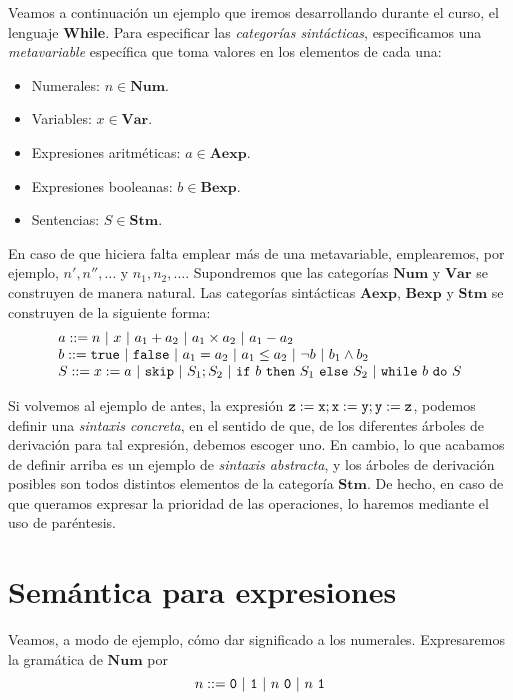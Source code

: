 Veamos a continuación un ejemplo que iremos desarrollando durante el curso, el lenguaje \textbf{While}. Para especificar las \textit{categorías sintácticas}, especificamos una \textit{metavariable} específica que toma valores en los elementos de cada una:
\begin{itemize}
    \item Numerales: $n\in \mathbf{Num}$.
    \item Variables: $x\in \mathbf{Var}$.
    \item Expresiones aritméticas: $a\in \mathbf{Aexp}$.
    \item Expresiones booleanas: $b\in \mathbf{Bexp}$.
    \item Sentencias: $S\in \mathbf{Stm}$.
\end{itemize}
En caso de que hiciera falta emplear más de una metavariable, emplearemos, por ejemplo, $n', n'', \dots$ y $n_1, n_2, \dots$. Supondremos que las categorías $\mathbf{Num}$ y $ \mathbf{Var}$ se construyen de manera natural. Las categorías sintácticas $\mathbf{Aexp}$, $\mathbf{Bexp}$ y $\mathbf{Stm}$ se construyen de la siguiente forma:
\[
    \begin{array}{l}
         a ::= n\ |\ x\ |\ a_1+ a_2\ |\ a_1\times a_2\ |\ a_1-a_2 \\
         b ::= \n{true}\ |\ \n{false}\ |\ a_1 = a_2\ |\ a_1 \leq a_2\ |\ \neg b\ |\ b_1 \land b_2 \\
         S ::= x:=a\ |\ \n{skip}\ |\ S_1;S_2\ |\ \n{if}\ b\ \n{then}\ S_1\ \n{else}\ S_2\ |\ \n{while}\ b\ \n{do}\ S
         
    \end{array}
\]


Si volvemos al ejemplo de antes, la expresión $\texttt{z} := \texttt{x}; \texttt{x} := \texttt{y}; \texttt{y} := \texttt{z}$, podemos definir una \textit{sintaxis concreta}, en el sentido de que, de los diferentes árboles de derivación para tal expresión, debemos escoger uno. En cambio, lo que acabamos de definir arriba es un ejemplo de \textit{sintaxis abstracta}, y los árboles de derivación posibles son todos distintos elementos de la categoría $\mathbf{Stm}$. De hecho, en caso de que queramos expresar la prioridad de las operaciones, lo haremos mediante el uso de paréntesis.

\section{Semántica para expresiones}

Veamos, a modo de ejemplo, cómo dar significado a los numerales. Expresaremos la gramática de $\mathbf{Num}$ por
\[
    n ::= \n{0}\ |\ \n{1} \ |\ n\ \n{0} \ |\ n\ \n{1}
\]


